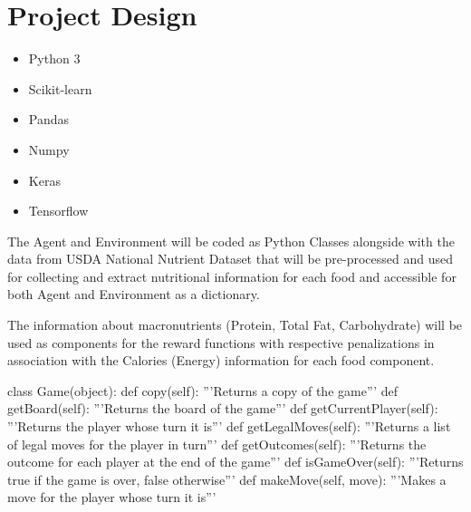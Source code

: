 \documentclass{article}
\begin{document}
\section{Project Design}

\begin{itemize}
    \item Python 3
    \item Scikit-learn
    \item Pandas
    \item Numpy
    \item Keras
    \item Tensorflow
\end{itemize}

The Agent and Environment will be coded as Python Classes alongside with the data from 
USDA National Nutrient Dataset that will be pre-processed and used for collecting and 
extract nutritional information for each food and accessible for both Agent and 
Environment as a dictionary. 

The information about macronutrients (Protein, Total Fat, Carbohydrate) will be 
used as components for the reward functions with respective penalizations in 
association with the Calories (Energy) information for each food component.

\begin{python}
	class Game(object):
	def copy(self):
	'''Returns a copy of the game'''
	def getBoard(self):
	'''Returns the board of the game'''
	def getCurrentPlayer(self):
	'''Returns the player whose turn it is'''
	def getLegalMoves(self):
	'''Returns a list of legal moves for the player in turn'''
	def getOutcomes(self):
	'''Returns the outcome for each player at the end of the game'''
	def isGameOver(self):
	'''Returns true if the game is over, false otherwise'''
	def makeMove(self, move):
	'''Makes a move for the player whose turn it is'''
\end{python}



\end{document}
